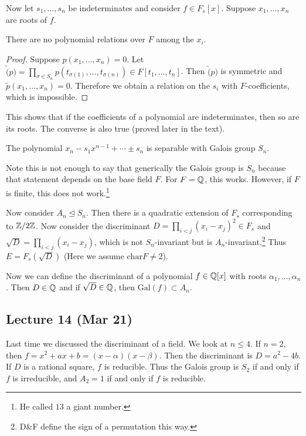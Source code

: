 \message{ !name(notes.tex)}\documentclass[10pt, twoside]{article}
\begin{document}
        Now let $s_1, \ldots, s_n$ be indeterminates and consider $f \in F_s[x]$. Suppose $x_1, \ldots, x_n$ are roots of $f$. 

        \begin{prop}
            There are no polynomial relations over $F$ among the $x_i$.
            \begin{proof}
                Suppose $p(x_1, \ldots, x_n) = 0$. Let $\widetilde(p) = \prod_{\sigma \in S_n} p(t_{\sigma(1)}, \ldots, t_{\sigma(n)}) \in F[t_1, \ldots, t_n]$. Then $\widetilde(p)$ is symmetric and $\widetilde{p}(x_1, \ldots, x_n) = 0$. Therefore we obtain a relation on the $s_i$ with $F$-coefficients, which is impossible. 
            \end{proof}
        \end{prop}

        This shows that if the coefficients of a polynomial are indeterminates, then so are its roots. The converse is also true (proved later in the text).

        \begin{thm}
            The polynomial $x_n - s_1x^{n-1} + \cdots \pm s_n$ is separable with Galois group $S_n$.
        \end{thm}

        Note this is not enough to say that generically the Galois group is $S_n$ because that statement depends on the base field $F$. For $F = \mathbb{Q}$, this works. However, if $F$ is finite, this does not work.\footnote{He called $13$ a giant number.}

        Now consider $A_n \trianglelefteq S_n$. Then there is a quadratic extension of $F_s$ corresponding to $\mathbb{Z}/2\mathbb{Z}$. Now consider the discriminant $D = \prod_{i<j} (x_i-x_j)^2 \in F_s$ and $\sqrt{D} = \prod_{i<j} (x_i-x_j)$, which is not $S_n$-invariant but is $A_n$-invariant.\footnote{D\&F define the sign of a permutation this way.} Thus $E = F_s(\sqrt{D})$ (Here we assume $\mathrm{char} F \neq 2$). 

        Now we can define the discriminant of a polynomial $f \in \mathbb{Q}[x]$ with roots $\alpha_1, \ldots, \alpha_n$. Then $D \in \mathbb{Q}$ and if $\sqrt{D} \in \mathbb{Q}$, then $\mathrm{Gal}(f) \subset A_n$.

        \subsection{Lecture 14 (Mar 21)}

        Last time we discussed the discriminant of a field. We look at $n \leq 4$. If $n = 2$, then $f = x^2 + ax + b = (x-\alpha)(x - \beta)$. Then the discriminant is $D = a^2 - 4b$. If $D$ is a rational square, $f$ is reducible. Thus the Galois group is $S_2$ if and only if $f$ is irreducible, and $A_2 = 1$ if and only if $f$ is reducible.
\end{document}
